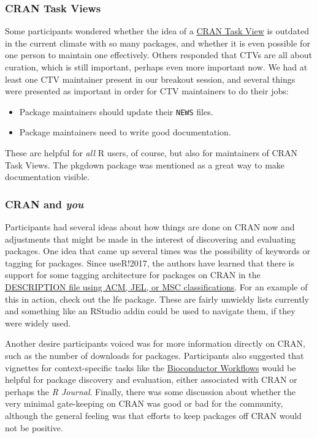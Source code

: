 \hypertarget{cran-task-views}{%
\subsubsection{CRAN Task Views}\label{cran-task-views}}

Some participants wondered whether the idea of a
\href{https://cran.r-project.org/web/views/}{CRAN Task View} is outdated
in the current climate with so many packages, and whether it is even
possible for one person to maintain one effectively. Others responded
that CTVs are all about curation, which is still important, perhaps even
more important now. We had at least one CTV maintainer present in our
breakout session, and several things were presented as important in
order for CTV maintainers to do their jobs:

\begin{itemize}
\tightlist
\item
  Package maintainers should update their \texttt{NEWS} files.
\item
  Package maintainers need to write good documentation.
\end{itemize}

These are helpful for \emph{all} R users, of course, but also for
maintainers of CRAN Task Views. The pkgdown \citep{pkgdown} package was
mentioned as a great way to make documentation visible.

\hypertarget{cran-and-you}{%
\subsubsection{\texorpdfstring{CRAN and
\emph{you}}{CRAN and you}}\label{cran-and-you}}

Participants had several ideas about how things are done on CRAN now and
adjustments that might be made in the interest of discovering and
evaluating packages. One idea that came up several times was the
possibility of keywords or tagging for packages. Since useR!2017, the
authors have learned that there is support for some tagging architecture
for packages on CRAN in the
\href{https://cran.r-project.org/doc/manuals/r-release/R-exts.html\#The-DESCRIPTION-file}{DESCRIPTION
file using ACM, JEL, or MSC classifications}. For an example of this in
action, check out the lfe \citep{lfe} package. These are fairly unwieldy
lists currently and something like an RStudio addin could be used to
navigate them, if they were widely used.

Another desire participants voiced was for more information directly on
CRAN, such as the number of downloads for packages. Participants also
suggested that vignettes for context-specific tasks like the
\href{https://www.bioconductor.org/help/workflows/}{Bioconductor
Workflows} would be helpful for package discovery and evaluation, either
associated with CRAN or perhaps the \emph{R Journal}. Finally, there was
some discussion about whether the very minimal gate-keeping on CRAN was
good or bad for the community, although the general feeling was that
efforts to keep packages off CRAN would not be positive.


